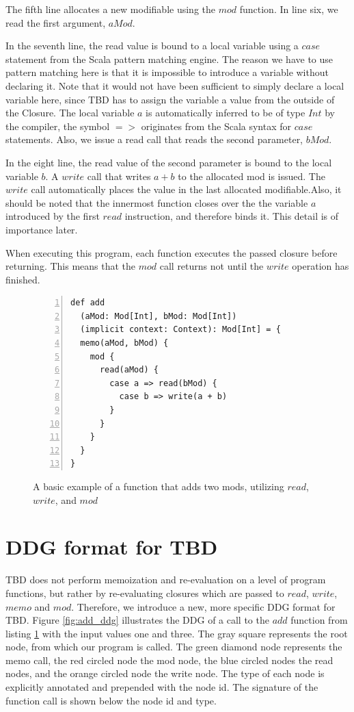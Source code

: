 The fifth line allocates a new modifiable using the $mod$ function. In line six, we read the first argument, $aMod$. 

In the seventh line, the read value is bound to a local variable using a $case$ statement from the Scala pattern matching engine. The reason we have to use pattern matching here is that it is impossible to introduce a variable without declaring it. Note that it would not have been sufficient to simply declare a local variable here, since TBD has to assign the variable a value from the outside of the Closure. The local variable $a$ is automatically inferred to be of type $Int$ by the compiler, the symbol $=>$ originates from the Scala syntax for $case$ statements. Also, we issue a read call that reads the second parameter, $bMod$.

In the eight line, the read value of the second parameter is bound to the local variable $b$. A $write$ call that writes $a + b$ to the allocated mod is issued. The $write$ call automatically places the value in the last allocated modifiable.Also, it should be noted that the innermost function closes over the the variable $a$ introduced by the first $read$ instruction, and therefore binds it. This detail is of importance later. 

When executing this program, each function executes the passed closure before returning. This means that the $mod$ call returns not until the $write$ operation has finished. 

\begin{figure}
\begin{lstlisting}[frame=single,basicstyle=\ttfamily,numbers=left]
def add
  (aMod: Mod[Int], bMod: Mod[Int])
  (implicit context: Context): Mod[Int] = {
  memo(aMod, bMod) {
    mod {
      read(aMod) {
        case a => read(bMod) {
          case b => write(a + b)
        }
      }
    }
  }
}

\end{lstlisting}
\caption{A basic example of a function that adds two mods, utilizing $read$, $write$, and $mod$}
\label{code:add_example}
\end{figure}

\section{DDG format for TBD}

TBD does not perform memoization and re-evaluation on a level of program functions, but rather by re-evaluating closures which are passed to $read$, $write$, $memo$ and $mod$. Therefore, we introduce a new, more specific DDG format for TBD. Figure \ref{fig:add_ddg} illustrates the DDG of a call to the $add$ function from listing \ref{code:add_example} with the input values one and three. The gray square represents the root node, from which our program is called. The green diamond node represents the memo call, the red circled node the mod node, the blue circled nodes the read nodes, and the orange circled node the write node. The type of each node is explicitly annotated and prepended with the node id. The signature of the function call is shown below the node id and type. 

